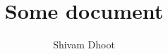 \documentclass{article}
\title{Some document}
\author{Shivam Dhoot}
\begin{document}
\maketitle
\lipsum
\end{document}
